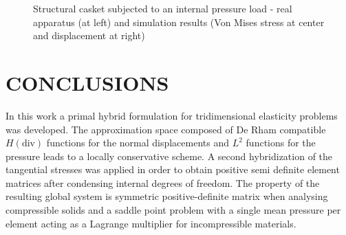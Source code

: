 \documentclass{wccm2024}
\begin{document}
\begin{figure} [!htb]
    \caption{Structural casket subjected to an internal pressure load - real apparatus (at left) and simulation results (Von Mises stress at center and displacement at right)}
    \label{fig:casket}
\end{figure}

\section{CONCLUSIONS}

In this work a primal hybrid formulation for tridimensional elasticity problems was developed. The approximation space composed of De Rham compatible $H(\text{div})$ functions for the normal displacements and  $L^2$ functions for the pressure leads to a locally conservative scheme. A second hybridization of the tangential stresses was applied in order to obtain positive semi definite element matrices after condensing internal degrees of freedom. The property of the resulting global system is  symmetric positive-definite matrix when analysing compressible solids and a saddle point problem with a single mean pressure per element acting as a Lagrange multiplier for incompressible materials.
\end{document}
